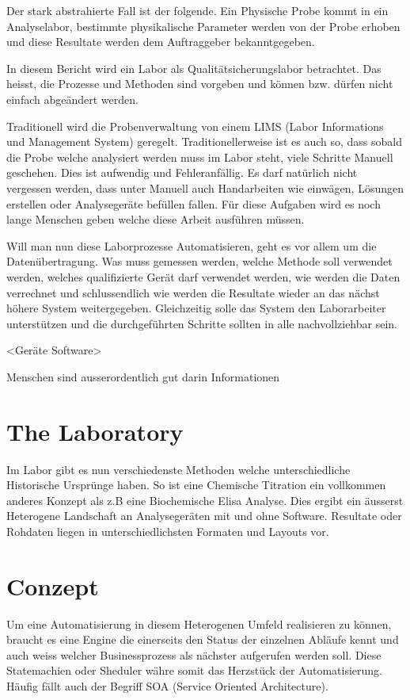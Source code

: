 \documentclass[paper=a4,twoside=false,BCOR=0mm,DIV=calc,fontsize=12pt]{scrartcl}
\begin{document}
Der stark abstrahierte Fall ist der folgende. Ein Physische Probe kommt in ein Analyselabor, bestimmte physikalische Parameter werden 
von der Probe erhoben und diese Resultate werden dem Auftraggeber bekanntgegeben.

In diesem Bericht wird ein Labor als Qualitätsicherungslabor betrachtet. Das heisst, die Prozesse und Methoden sind vorgeben und können bzw. dürfen nicht 
einfach abgeändert werden.

Traditionell wird die Probenverwaltung von einem LIMS (Labor Informations und Management System) geregelt. Traditionellerweise ist es auch so, dass
sobald die Probe welche analysiert werden muss im Labor steht, viele Schritte Manuell geschehen. Dies ist aufwendig und Fehleranfällig. 
Es darf natürlich nicht vergessen werden, dass unter Manuell auch Handarbeiten wie einwägen, Lösungen erstellen oder Analysegeräte befüllen fallen.
Für diese Aufgaben wird es noch lange Menschen geben welche diese Arbeit ausführen müssen.

Will man nun diese Laborprozesse Automatisieren, geht es vor allem um die Datenübertragung. 
Was muss gemessen werden, welche Methode soll verwendet werden,
welches qualifizierte Gerät darf verwendet werden, 
wie werden die Daten verrechnet und schlussendlich wie werden die Resultate wieder an das nächst höhere System weitergegeben.
Gleichzeitig solle das System den Laborarbeiter unterstützen und die durchgeführten Schritte sollten in alle nachvollziehbar sein.


<Geräte Software>



Menschen sind ausserordentlich gut darin Informationen 


\section{The Laboratory}
Im Labor gibt es nun verschiedenste Methoden welche unterschiedliche Historische Ursprünge haben. So ist eine Chemische Titration ein
vollkommen anderes Konzept als z.B eine Biochemische Elisa Analyse.
Dies ergibt ein äusserst Heterogene Landschaft an Analysegeräten mit und ohne Software. Resultate oder Rohdaten liegen in unterschiedlichsten Formaten und Layouts vor.





\section{Conzept}
Um eine Automatisierung in diesem Heterogenen Umfeld realisieren zu können, braucht es eine Engine die einerseits den Status der einzelnen
Abläufe kennt und auch weiss welcher Businessprozess als nächster aufgerufen werden soll. Diese Statemachien oder Sheduler währe somit das
Herzstück der Automatisierung. Häufig fällt auch der Begriff SOA (Service Oriented Architecture).
\end{document}

